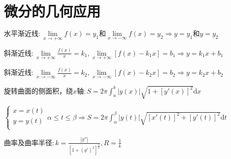 \section{微分的几何应用}

\begin{spacing}{\hangju}
    \noindent $\mbox{水平渐近线}\colon \lim\limits_{x \to +\infty}{f(x)} = y_{1} \mbox{和}\lim\limits_{x \to -\infty}{f(x)} = y_{2} \Rightarrow y = y_{1}和y = y_{2}$

    \noindent $\mbox{斜渐近线}\colon \lim\limits_{x \to +\infty}{\frac{f(x)}{x}} = k_{1}, \lim\limits_{x \to +\infty}{[f(x) - k_{1}x]} = b_{1} \Rightarrow y = k_{1}x + b_{1}$

    \noindent $\mbox{斜渐近线}\colon \lim\limits_{x \to -\infty}{\frac{f(x)}{x}} = k_{2}, \lim\limits_{x \to -\infty}{[f(x) - k_{2}x]} = b_{2} \Rightarrow y = k_{2}x + b_{2}$

    \noindent $\mbox{旋转曲面的侧面积，绕}x\mbox{轴}\colon S = 2\pi\int_{a}^{b}{|y(x)|\sqrt{1 + [y'(x)]^2}\mathrm{d}x}$

    \noindent $\left\{\begin{array}{l}
        x = x(t)\\
        y = y(t)\\
    \end{array}\right. \alpha \le t \le \beta \Rightarrow S = 2\pi\int_{\alpha}^{\beta}{|y(t)|\sqrt{[x'(t)]^2 + [y'(t)]^2}\mathrm{d}t}$

    \noindent $\mbox{曲率及曲率半径}\colon k = \frac{|y''|}{[1 + (y')^2]^{\frac{3}{2}}}, R = \frac{1}{k}$
\end{spacing}